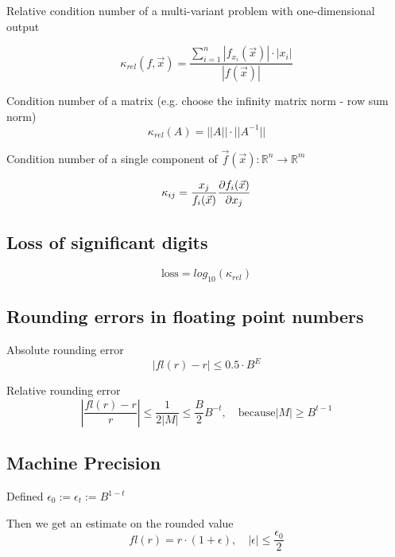 \documentclass[
    a4paper,
    11pt
]{article}
\begin{document}
Relative condition number of a multi-variant problem with one-dimensional output

\begin{equation}
    \kappa_{rel}(f, \vec{x}) =
    \frac{
        \sum_{i=1}^{n} \left| f_{x_i}(\vec{x}) \right| \cdot |x_i|
    } {
        \left| f(\vec{x}) \right|
    }
\end{equation}

Condition number of a matrix (e.g. choose the infinity matrix norm - row sum
norm)
\begin{equation}
    \kappa_{rel}(A) = ||A|| \cdot ||A^{-1}||
\end{equation}

Condition number of a single component of $\vec{f}(\vec{x}) : \mathbb{R}^n
\to \mathbb{R}^m$

\begin{equation}
    \kappa_{ij} = \frac{x_j}{f_i(\vec{x})} \pdv{f_i(\vec{x})}{x_j}
\end{equation}

\subsection{Loss of significant digits}

\begin{equation}
    \text{loss} = log_{10}(\kappa_{rel})
\end{equation}

\subsection{Rounding errors in floating point numbers}

Absolute rounding error
\begin{equation}
    |fl(r) - r| \leq 0.5 \cdot B^E
\end{equation}

Relative rounding error
\begin{equation}
    \left| \frac{fl(r) - r}{r} \right| \leq \frac{1}{2|M|} \leq \frac{B}{2}
    B^{-t}, \quad \text{because} |M| \geq B^{t-1}
\end{equation}

\subsection{Machine Precision}

Defined $\epsilon_0 := \epsilon_t := B^{1-t}$

Then we get an estimate on the rounded value
\begin{equation}
    fl(r) = r \cdot (1 + \epsilon), \quad |\epsilon| \leq \frac{\epsilon_0}{2}
\end{equation}
\end{document}
